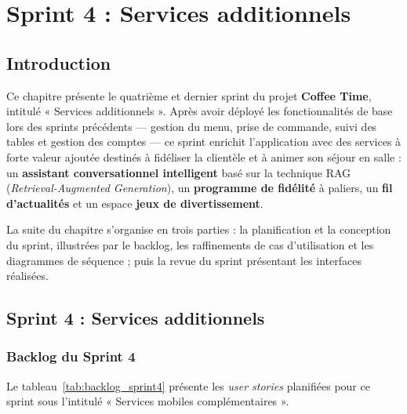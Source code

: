 
\chapter{Sprint 4 : Services additionnels}

\section{Introduction}

Ce chapitre présente le quatrième et dernier sprint du projet \textbf{Coffee Time},
intitulé « Services additionnels ». Après avoir déployé les fonctionnalités de base
lors des sprints précédents — gestion du menu, prise de commande, suivi des tables et
gestion des comptes — ce sprint enrichit l'application avec des services à forte valeur
ajoutée destinés à fidéliser la clientèle et à animer son séjour en salle :
un \textbf{assistant conversationnel intelligent} basé sur la technique RAG
(\textit{Retrieval-Augmented Generation}), un \textbf{programme de fidélité} à paliers,
un \textbf{fil d'actualités} et un espace \textbf{jeux de divertissement}.

La suite du chapitre s'organise en trois parties : la planification et la conception
du sprint, illustrées par le backlog, les raffinements de cas d'utilisation et les
diagrammes de séquence ; puis la revue du sprint présentant les interfaces réalisées.

\section{Sprint 4 : Services additionnels}

\subsection{Backlog du Sprint 4}

Le tableau~\ref{tab:backlog_sprint4} présente les \textit{user stories} planifiées
pour ce sprint sous l'intitulé « Services mobiles complémentaires ».

